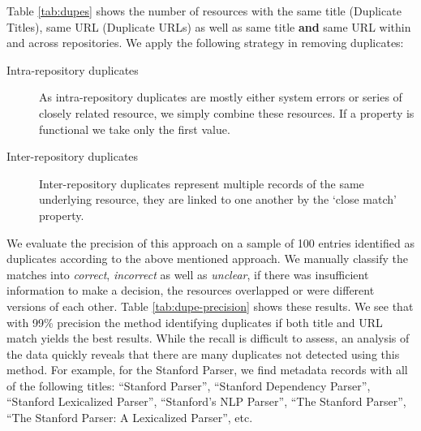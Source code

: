 \documentclass[11pt]{article}
\begin{document}
Table \ref{tab:dupes} shows the number of resources with the same title (Duplicate Titles), same URL (Duplicate URLs) as well as same title \textbf{and} same URL within and across repositories. 
We apply the following strategy in removing duplicates:

\begin{description}
    \item[Intra-repository duplicates] As intra-repository duplicates are
        mostly either system errors or series of closely related resource, we
        simply combine these resources. If a property is functional we take only the
        first value.
    \item[Inter-repository duplicates] Inter-repository duplicates represent
        multiple records of the same underlying resource, they are linked to one
        another by the `close match' property.
\end{description}



We evaluate the precision of this approach on a sample of 100 entries identified
as duplicates according to the above mentioned approach. We manually classify
the matches into \emph{correct}, \emph{incorrect} as well as \emph{unclear}, if
there was insufficient information to make a decision, the resources overlapped
or were different versions of each other. Table \ref{tab:dupe-precision} shows these results. We see that with 99\% precision the method identifying duplicates if both title and URL match yields the best results. While the recall is difficult to assess, an analysis of the data quickly reveals that there are many duplicates not detected using this method. For example, for the Stanford Parser, we find metadata records with all of the following titles: ``Stanford Parser'', ``Stanford Dependency Parser'',  ``Stanford Lexicalized Parser'', ``Stanford's NLP Parser'', ``The Stanford Parser'', ``The Stanford Parser: A Lexicalized Parser'', etc.
\end{document}
